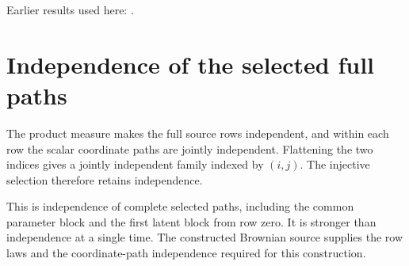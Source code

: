 \documentclass[11pt,a4paper]{article}
\begin{document}
Earlier results used here: \cite[Section~3.32.1]{LangevinLean2026ULASC}.

\section{\texorpdfstring{Independence of the selected full paths}{Independence of the selected full paths}}


The product measure makes the full source rows independent, and within each row the scalar coordinate paths are jointly independent. Flattening the two indices gives a jointly independent family indexed by \((i,j)\). The injective selection therefore retains independence.



This is independence of complete selected paths, including the common parameter block and the first latent block from row zero. It is stronger than independence at a single time. The constructed Brownian source supplies the row laws and the coordinate-path independence required for this construction.
\end{document}
